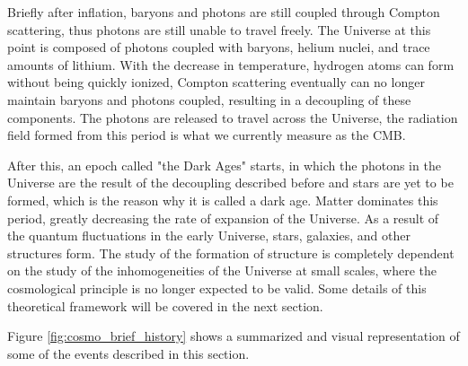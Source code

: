 \documentclass[openany,a4paper,12pt,oneside]{book}
\begin{document}
\begin{spacing}{1.5}
Briefly after inflation, baryons and photons are still coupled through Compton scattering, thus photons are still unable to travel freely. The Universe at this point is composed of photons coupled with baryons, helium nuclei, and trace amounts of lithium. With the decrease in temperature, hydrogen atoms can form without being quickly ionized, Compton scattering eventually can no longer maintain baryons and photons coupled, resulting in a decoupling of these components. The photons are released to travel across the Universe, the radiation field formed from this period is what we currently measure as the CMB. 

After this, an epoch called "the Dark Ages" starts, in which the photons in the Universe are the result of the decoupling described before and stars are yet to be formed, which is the reason why it is called a dark age. Matter dominates this period, greatly decreasing the rate of expansion of the Universe. As a result of the quantum fluctuations in the early Universe, stars, galaxies, and other structures form. The study of the formation of structure is completely dependent on the study of the inhomogeneities of the Universe at small scales, where the cosmological principle is no longer expected to be valid. Some details of this theoretical framework will be covered in the next section.

Figure \ref{fig:cosmo_brief_history} shows a summarized and visual representation of some of the events described in this section.


\end{spacing}
\end{document}
